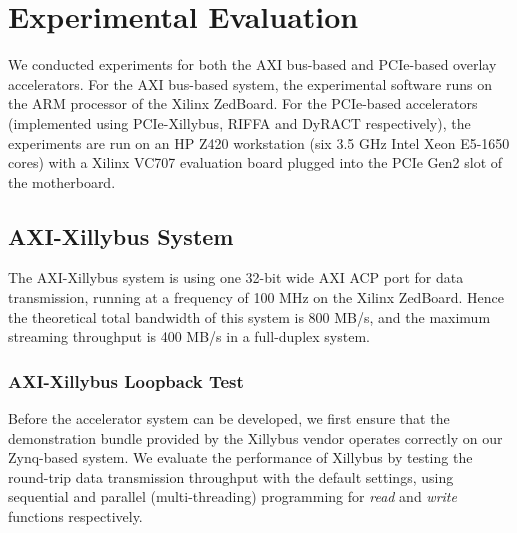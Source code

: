 \section{Experimental Evaluation}
\label{section_5}
We conducted experiments for both the AXI bus-based and PCIe-based overlay accelerators.  
For the AXI bus-based system, the experimental software runs on the ARM processor of the Xilinx ZedBoard. 
For the PCIe-based accelerators (implemented using PCIe-Xillybus, RIFFA and DyRACT respectively), the experiments are run on an HP Z420 workstation (six 3.5 GHz Intel Xeon E5-1650 cores) with a Xilinx VC707 evaluation board plugged into the PCIe Gen2 slot of the motherboard. 

\subsection{AXI-Xillybus System}
The AXI-Xillybus system is using one 32-bit wide AXI ACP port for data transmission, running at a frequency of 100 MHz on the Xilinx ZedBoard. 
Hence the theoretical total bandwidth of this system is 800 MB/s, and the maximum streaming throughput is 400 MB/s in a full-duplex system. 

\subsubsection{AXI-Xillybus Loopback Test}
Before the accelerator system can be developed, we first ensure that the demonstration bundle provided by the Xillybus vendor operates correctly on our Zynq-based system. 
We evaluate the performance of Xillybus by testing the round-trip data transmission throughput with the default settings, using sequential and parallel (multi-threading) programming for \textit{read} and \textit{write} functions respectively. 

